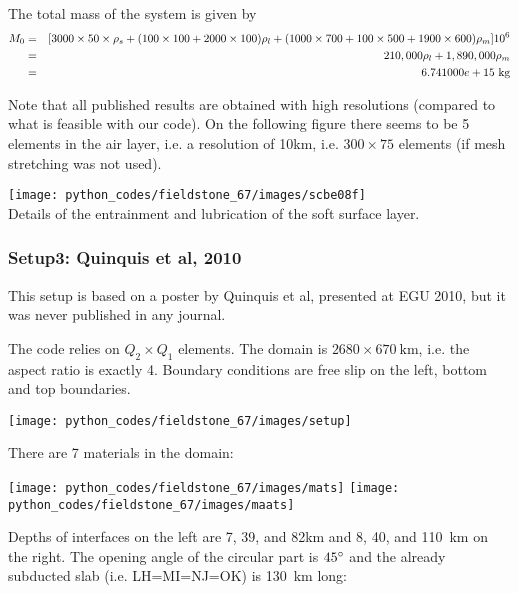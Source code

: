 The total mass of the system is given by
\begin{eqnarray}
M_0 &=& [3000\times 50\times \rho_s + (100\times 100+ 2000\times 100)\rho_l + 
(1000\times 700 + 100\times 500 + 1900\times 600)\rho_m] 10^6\nn\\
&=&210,000 \rho_l + 1,890,000 \rho_m \nn\\
&=&6.741000e+15~\si{\kg}
\end{eqnarray}

Note that all published results are obtained with high resolutions (compared to what is 
feasible with our code). On the following figure there seems to be 5 elements in the air layer, 
i.e. a resolution of 10km, i.e. $300\times 75$ elements (if mesh stretching was not used).
\begin{center}
\texttt{[image: python\_codes/fieldstone\_67/images/scbe08f]}\\
{\captionfont Details of the entrainment and lubrication of the soft surface layer.}
\end{center}

\subsubsection*{Setup3: Quinquis et al, 2010}

This setup is based on a poster by Quinquis et al, presented at EGU 2010, but it
was never published in any journal.

The code relies on $Q_2\times Q_1$ elements. 
The domain is $2680\times 670~\si{\km}$, i.e. the aspect ratio is exactly 4.
Boundary conditions are free slip on the left, bottom and top boundaries. 

\begin{center}
\texttt{[image: python\_codes/fieldstone\_67/images/setup]}
\end{center}

There are 7 materials in the domain:
\begin{center}
\texttt{[image: python\_codes/fieldstone\_67/images/mats]}
\texttt{[image: python\_codes/fieldstone\_67/images/maats]}
\end{center}

Depths of interfaces on the left are 7, 39, and 82\si{\km} and 
8, 40, and 110~\si{\km} on the right.
The opening angle of the circular part is $45\degree$ and the 
already subducted slab (i.e. LH=MI=NJ=OK) is 130~\si{\km} long:


